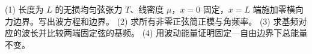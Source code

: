 (1) 长度为 \(L\) 的无损均匀弦张力 \(T\)、线密度 \(\mu\)，\(x=0\) 固定，\(x=L\) 端施加零横向力边界。写出波方程和边界。
(2) 求所有非零正弦简正模与角频率。
(3) 求基频对应的波长并比较两端固定弦的基频。
(4) 用波动能量证明固定—自由边界下总能量不变。
